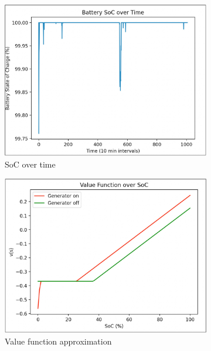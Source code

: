 \documentclass{article}
\begin{document}
\begin{figure}[H]
  \centering
  \begin{subfigure}[b]{0.3\linewidth}
    \includegraphics[width=\linewidth]{pics/nnsocvtime.jpg}
    \caption{SoC over time}
  \end{subfigure}
  \begin{subfigure}[b]{0.3\linewidth}
    \includegraphics[width=\linewidth]{pics/nnvaluefunc.jpg}
    \caption{Value function approximation}
  \end{subfigure}
  \begin{subfigure}[b]{0.3\linewidth}

\end{subfigure}
\end{figure}
\end{document}

